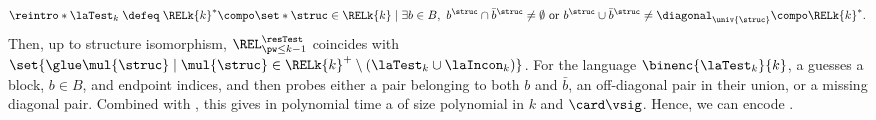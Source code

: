 \AP
{}
\[\reintro*\laTest_{k} \;\defeq\;
\RELk{k}^{*} \compo
\set*{\struc \in \RELk{k} \mid \exists b \in B,\
b^{\struc} \cap \bar{b}^{\struc} \neq \emptyset
\text{ or } b^{\struc} \cup \bar{b}^{\struc} \neq \diagonal_{\univ{\struc}} } \compo
\RELk{k}^{*}.\]
Then, up to structure isomorphism,
$\REL^{\resTest}_{\pw \le k-1}$ coincides with
$\set{\glue \mul{\struc} \mid \mul{\struc} \in \RELk{k}^{+} \setminus (\laTest_{k} \cup \laIncon_{k})}$.
For the language $\binenc{\laTest_{k}}{k}$,
a  guesses a block, $b\in B$, and endpoint indices, and then probes either
a pair belonging to both $b$ and $\bar b$, an off-diagonal pair in their union,
or a missing diagonal pair.
Combined with , this gives in polynomial time
a \kl{2AFA} of size polynomial in $k$ and $\card\vsig$.
Hence, we can encode .


